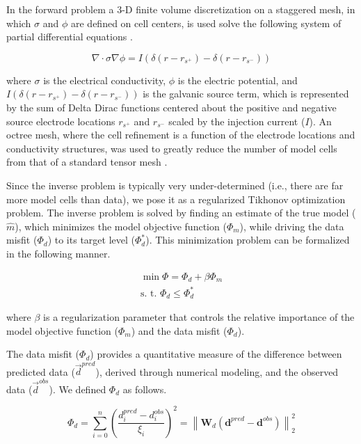 \documentclass[preprint,authoryear,12pt]{elsarticle}
\begin{document}
In the forward problem a 3-D finite volume discretization on a staggered mesh, in which $\sigma$ and $\phi$ are defined on cell centers, is used solve the following system of partial differential equations \citep{Haber2000, Pidlisecky2007, Cockett2015, Cockett2016}.

\begin{equation}
   \nabla\cdot\sigma\nabla \phi = I(\delta(r - r_{s^{+}}) - \delta(r - r_{s^{-}}))
  \label{eq:DC_Eq}
\end{equation}

\noindent where $\sigma$ is the electrical conductivity, $\phi$ is the electric potential, and $I(\delta(r - r_{s^{+}}) - \delta(r - r_{s^{-}}))$ is the galvanic source term, which is represented by the sum of Delta Dirac functions centered about the positive and negative source electrode locations $r_{s^{+}}$ and $r_{s^{-}}$ scaled by the injection current ($I$). An octree mesh, where the cell refinement is a function of the electrode locations and conductivity structures, was used to greatly reduce the number of model cells from that of a standard tensor mesh \citep{Haber2007,Haber2012}.

Since the inverse problem is typically very under-determined (i.e., there are far more model cells than data), we pose it as a regularized Tikhonov optimization problem. The inverse problem is solved by finding an estimate of the true model ($\widehat{m}$), which minimizes the model objective function ($\Phi_m$), while driving the data misfit ($\Phi_d$) to its target level ($\Phi_{d}^*$).  This minimization problem can be formalized in the following manner.

\begin{eqnarray}
  \label{eq:globphi}
  \min \Phi = \Phi_d+\beta\Phi_m \\
  \mbox{s. t. } \Phi_{d} \leq \Phi_{d}^* \nonumber
\end{eqnarray}

\noindent where $\beta$ is a regularization parameter that controls the relative importance of the model objective function ($\Phi_{m}$) and the data misfit ($\Phi_{d}$).

The data misfit ($\Phi_{d}$) provides a quantitative measure of the difference between predicted data ($\vec{d}^{pred}$), derived through numerical modeling, and the observed data ($\vec{d}^{obs}$). We defined $\Phi_{d}$ as follows.

\begin{equation}
  \Phi_d = \sum^{n}_{i=0}\left(\frac{d^{pred}_i - d^{obs}_i}{\xi_i}\right)^2 = \left\|\mathbf{W}_{d}\left(\mathbf{d}^{pred} - \mathbf{d}^{obs}\right)\right\|_2^2
  \label{eq:Phi_d}
\end{equation}
\end{document}

